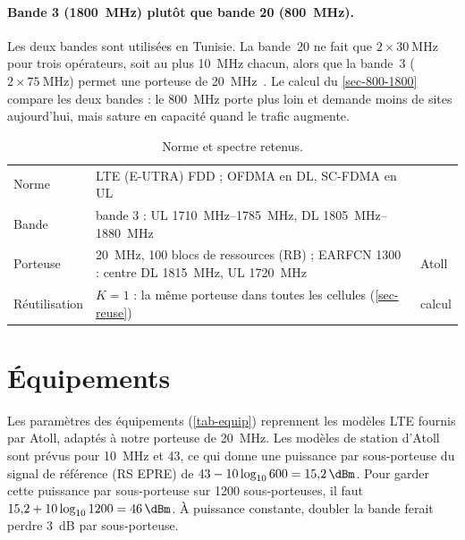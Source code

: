 \paragraph{Bande 3 (\SI{1800}{\mega\hertz}) plutôt que bande 20 (\SI{800}{\mega\hertz}).} Les deux bandes sont utilisées en Tunisie. La bande~20 ne fait que $2 × \SI{30}{\mega\hertz}$ pour trois opérateurs, soit au plus \SI{10}{\mega\hertz} chacun, alors que la bande~3 ($2 × \SI{75}{\mega\hertz}$) permet une porteuse de \SI{20}{\mega\hertz}~\cite{ts36101}. Le calcul du \cref{sec-800-1800} compare les deux bandes : le \SI{800}{\mega\hertz} porte plus loin et demande moins de sites aujourd'hui, mais sature en capacité quand le trafic augmente.

\begin{table}[H]
\centering
\caption{Norme et spectre retenus.}
\label{tab-norme}
\begin{tabularx}{\textwidth}{@{}lLl@{}}
\toprule
{} &  &  \\
\midrule
Norme & LTE (E-UTRA) FDD ; OFDMA en DL, SC-FDMA en UL & \cite{ts36211} \\
Bande & bande 3 : UL \SIrange{1710}{1785}{\mega\hertz}, DL \SIrange{1805}{1880}{\mega\hertz} & \cite{ts36101} \\
Porteuse & \SI{20}{\mega\hertz}, 100 blocs de ressources (RB) ; EARFCN 1300 : centre DL \SI{1815}{\mega\hertz}, UL \SI{1720}{\mega\hertz} & Atoll \\
Réutilisation & $K = 1$ : la même porteuse dans toutes les cellules (\cref{sec-reuse}) & calcul \\
\bottomrule
\end{tabularx}
\end{table}

\section{Équipements}

Les paramètres des équipements (\cref{tab-equip}) reprennent les modèles LTE fournis par Atoll, adaptés à notre porteuse de \SI{20}{\mega\hertz}. Les modèles de station d'Atoll sont prévus pour \SI{10}{\mega\hertz} et \SI{43}{\dBm}, ce qui donne une puissance par sous-porteuse du signal de référence (RS EPRE) de $43 - 10\log_{10} 600 = \SI{15,2}{\dBm}$. Pour garder cette puissance par sous-porteuse sur \num{1200} sous-porteuses, il faut $15{,}2 + 10\log_{10} 1200 = \SI{46}{\dBm}$. À puissance constante, doubler la bande ferait perdre \SI{3}{\deci\bel} par sous-porteuse.

